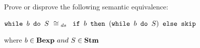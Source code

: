 \newcommand{\exTen}
{
	$ \wbS{b}{S} ~\cong{}_{ds}~$
	{$\ifABC{b}{(\wbS{b}{S})}{\skipistr}$}
}
{
	Prove or disprove the following semantic equivalence:
	\begin{center}
		\exTen{}
	\end{center}
	where $b\in\mbox{\textbf{Bexp}}~and~S\in\mbox{\textbf{Stm}}$
}
{}
\newpage